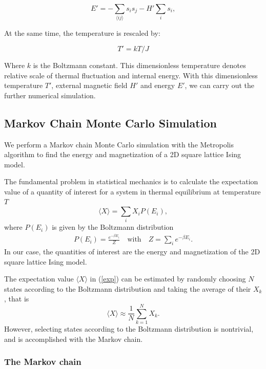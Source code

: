 \documentclass[11pt]{article}
\begin{document}
\begin{equation}
    E' = -\sum_{\langle ij \rangle} s_i s_j - H' \sum_{i} s_i,
\end{equation}

At the same time, the temperature is rescaled by:

\begin{equation}
    T' = kT/J
\end{equation}

Where $k$ is the Boltzmann constant. This dimensionless temperature denotes relative scale of thermal fluctuation and internal energy. With this dimensionless temperature $T'$, external magnetic field $H'$ and energy $E'$, we can carry out the further numerical simulation.

\subsection{Markov Chain Monte Carlo Simulation}
We perform a Markov chain Monte Carlo simulation with the Metropolis algorithm to find the energy and magnetization of a 2D square lattice Ising model.

The fundamental problem in statistical mechanics is to calculate the expectation value of a quantity of interest for a system in thermal equilibrium at temperature $T$
\begin{equation}\label{exp}
    \langle X \rangle = \sum_i X_i P(E_i),
\end{equation}
where $P(E_i)$ is given by the Boltzmann distribution
\begin{equation}
\begin{gathered}
    P(E_i) = \frac{e^{-\beta E_i}}{Z} \quad \text{with} \quad Z = \sum_i e^{-\beta E_i}.
\end{gathered}
\end{equation}
In our case, the quantities of interest are the energy and magnetization of the 2D square lattice Ising model.

The expectation value $\langle X \rangle$ in (\ref{exp}) can be estimated by randomly choosing $N$ states according to the Boltzmann distribution and taking the average of their $X_k$, that is
\begin{equation}\label{estimate}
    \langle X \rangle \approx \frac{1}{N} \sum_{k=1}^{N} X_k.
\end{equation}
However, selecting states according to the Boltzmann distribution is nontrivial, and is accomplished with the Markov chain.

\subsubsection{The Markov chain}
\end{document}
